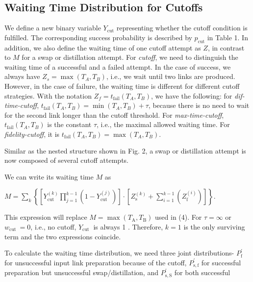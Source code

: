 \documentclass{masterthesis}
\begin{document}
\subsection*{Waiting Time Distribution for Cutoffs}
We define a new binary variable $Y_{\text{cut}}$ representing whether the cutoff condition is fulfilled. The corresponding success probability is described by $p_{\text{cut}}$ in Table 1. In addition, we also define the waiting time of one cutoff attempt as $Z$, in contrast to $M$ for a swap or distillation attempt. For \textit{cutoff}, we need to distinguish the waiting time of a successful and a failed attempt. In the case of success, we always have $Z_s = \max(T_A, T_B)$, i.e., we wait until two links are produced. However, in the case of failure, the waiting time is different for different cutoff strategies. With the notation $Z_f = t_{\text{fail}}(T_A, T_B)$, we have the following: for \textit{dif-time-cutoff}, $t_{\text{fail}}(T_A, T_B) = \min(T_A, T_B) + \tau$, because there is no need to wait for the second link longer than the cutoff threshold. For \textit{max-time-cutoff}, $t_{\text{fail}}(T_A, T_B)$ is the constant $\tau$, i.e., the maximal allowed waiting time. For \textit{fidelity-cutoff}, it is $t_{\text{fail}}(T_A, T_B) = \max(T_A, T_B)$.

Similar as the nested structure shown in Fig. 2, a swap or distillation attempt is now composed of several cutoff attempts.

We can write its waiting time $M$ as

$M=\sum_{k}\left\{\left[Y_{\text {cut }}^{(k)} \prod_{j=1}^{k-1}\left(1-Y_{\text {cut }}^{(j)}\right)\right] \cdot\left[Z_{\mathrm{s}}^{(k)}+\sum_{i=1}^{k-1}\left(Z_{\mathrm{f}}^{(i)}\right)\right]\right\}$.

This expression will replace $M=\max \left(T_{\mathrm{A}}, T_{\mathrm{B}}\right)$ used in (4). For $\tau=\infty$ or $w_{\text {cut }}=0$, i.e., no cutoff, $Y_{\text {cut }}$ is always 1 . Therefore, $k=1$ is the only surviving term and the two expressions coincide.

To calculate the waiting time distribution, we need three joint distributions- $P_{\mathrm{f}}^{\prime}$ for unsuccessful input link preparation because of the cutoff, $P_{\mathrm{s}, \mathrm{f}}^{\prime}$ for successful preparation but unsuccessful swap/distillation, and $P_{\mathrm{s}, \mathrm{S}}^{\prime}$ for both successful
\end{document}
